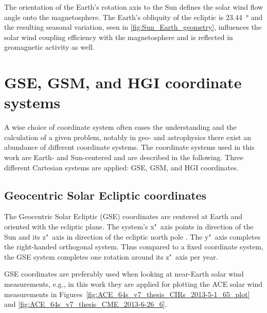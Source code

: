 The orientation of the Earth's rotation axis to the Sun defines the solar wind flow angle onto the magnetosphere. The Earth's obliquity of the ecliptic is \SI{23.44}{\degree} \citep{Luzum2011} and the resulting seasonal variation, seen in \autoref{fig:Sun_Earth_geometry}, influences the solar wind coupling efficiency with the magnetosphere and is reflected in geomagnetic activity as well.


\section{GSE, GSM, and HGI coordinate systems}
\label{sec:coordinate_systems}

A wise choice of coordinate system often eases the understanding and the calculation of a given problem, notably in geo- and astrophysics there exist an abundance of different coordinate systems. The coordinate systems used in this work are Earth- and Sun-centered and are described in the following. Three different Cartesian systems are applied: GSE, GSM, and HGI coordinates.

\subsection*{Geocentric Solar Ecliptic coordinates}
The Geocentric Solar Ecliptic (GSE) coordinates are centered at Earth and oriented with the ecliptic plane. The system's x"~axis points in direction of the Sun and its z"~axis in direction of the ecliptic north pole \citep{Russell1971,Hapgood1992}. The y"~axis completes the right-handed orthogonal system.
Thus compared to a fixed coordinate system, the GSE system completes one rotation around its z"~axis per year.

GSE coordinates are preferably used when looking at near-Earth solar wind measurements, e.g., in this work they are applied for plotting the ACE solar wind measurements in Figures~\ref{fig:ACE_64s_v7_thesis_CIRs_2013-5-1_65_plot} and \ref{fig:ACE_64s_v7_thesis_CME_2013-6-26_6}.

